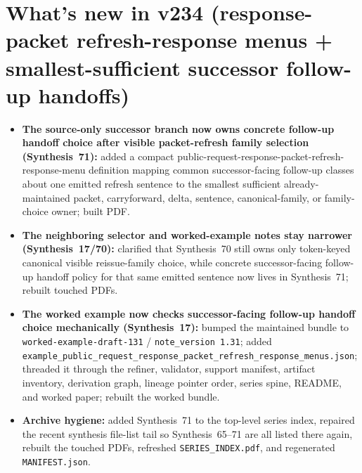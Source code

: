 \documentclass[11pt]{article}
\begin{document}
\section{What's new in v234 (response-packet refresh-response menus + smallest-sufficient successor follow-up handoffs)}
\begin{itemize}[leftmargin=*]
\item \textbf{The source-only successor branch now owns concrete follow-up handoff choice after visible packet-refresh family selection (Synthesis~71):} added a compact public-request-response-packet-refresh-response-menu definition mapping common successor-facing follow-up classes about one emitted refresh sentence to the smallest sufficient already-maintained packet, carryforward, delta, sentence, canonical-family, or family-choice owner; built PDF.
\item \textbf{The neighboring selector and worked-example notes stay narrower (Synthesis~17/70):} clarified that Synthesis~70 still owns only token-keyed canonical visible reissue-family choice, while concrete successor-facing follow-up handoff policy for that same emitted sentence now lives in Synthesis~71; rebuilt touched PDFs.
\item \textbf{The worked example now checks successor-facing follow-up handoff choice mechanically (Synthesis~17):} bumped the maintained bundle to \texttt{worked-example-draft-131} / \texttt{note\_version 1.31}; added \texttt{example\_public\_request\_response\_packet\_refresh\_response\_menus.json}; threaded it through the refiner, validator, support manifest, artifact inventory, derivation graph, lineage pointer order, series spine, README, and worked paper; rebuilt the worked bundle.
\item \textbf{Archive hygiene:} added Synthesis~71 to the top-level series index, repaired the recent synthesis file-list tail so Synthesis~65--71 are all listed there again, rebuilt the touched PDFs, refreshed \texttt{SERIES\_INDEX.pdf}, and regenerated \texttt{MANIFEST.json}.
\end{itemize}
\end{document}
